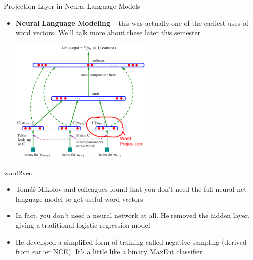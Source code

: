 \documentclass[xcolor=pdftex,x11names,table,hyperref]{beamer}
\begin{document}
\begin{frame}{Projection Layer in Neural Language Models}
\begin{itemize}
	\item \textbf{Neural Language Modeling} -- this was actually one of the earliest uses of word vectors.  We'll talk more about these later this semester \\
		\begin{center}
		\includegraphics[width=0.55\textwidth]{images/bengio-etal2003_pg6_image_alt.pdf}
		\end{center}
\end{itemize}
\end{frame}


\begin{frame}{word2vec}
\begin{itemize}
	\item Tom\'{a}\v{s} Mikolov and colleagues found that you don't need the full neural-net language model to get useful word vectors
	\pause
	\item In fact, you don't need a neural network at all. He removed the hidden layer, giving a traditional logistic regression model
	\pause
	\item He developed a simplified form of training called negative sampling (derived from earlier NCE).  It's a little like a binary MaxEnt  classifier
\end{itemize}
\end{frame}
\end{document}
